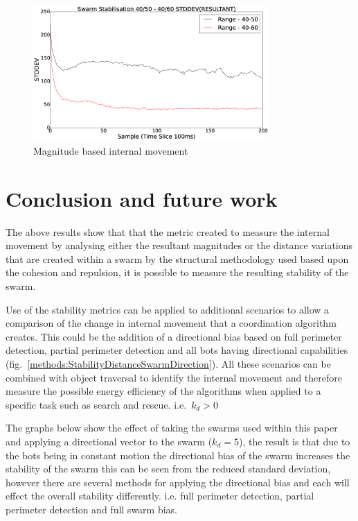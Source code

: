 \documentclass[10pt,journal,letterpaper,twoside]{IEEEtran}
\newcommand{\stability}{internal movement}
\newcommand{\Fig}{fig.}
\begin{document}
\begin{figure}[H]
\begin{center}
\includegraphics[width=9cm]{figures/StabilityMagnitudeSwarm}
\end{center}
\caption{Magnitude based \stability{}\label{methods:StabilityMagnitudeSwarm}}
\end{figure}

\section{Conclusion and future work\label{section:futureWork}}

The above results show that that the metric created to measure the \stability{} by analysing either the resultant magnitudes or the distance variations that are created within a swarm by the structural methodology used based upon the cohesion and repulsion, it is possible to measure the resulting stability of the swarm.

Use of the stability metrics can be applied to additional scenarios to allow a comparison of the change in \stability{} that a coordination algorithm creates. This could be the addition of a directional bias based on full perimeter detection, partial perimeter detection and all bots having directional capabilities (\Fig{}~\ref{methods:StabilityDistanceSwarmDirection}).
All these scenarios can be combined with object traversal to identify the \stability{} and therefore measure the possible energy efficiency of the algorithms when applied to a specific task such as search and rescue. i.e.~${k_d > 0}$

The graphs below show the effect of taking the swarms used within this paper and applying a directional vector to the swarm ($k_d = 5$), the result is that due to the bots being in constant motion the directional bias of the swarm increases the stability of the swarm this can be seen from the reduced standard deviation, however there are several methods for applying the directional bias and each will effect the overall stability differently. i.e. full perimeter detection, partial perimeter detection and full swarm bias.
\end{document}
